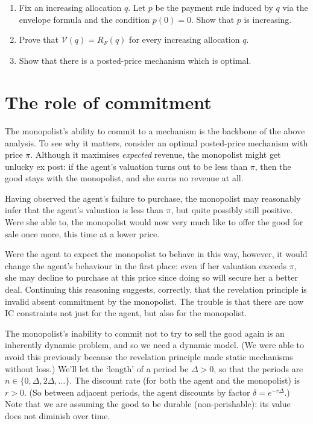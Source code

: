 \begin{exercise}
\begin{enumerate}[label=(\alph*)]
\begin{enumerate}[label=(\roman*)]
			\item Fix an increasing allocation $q$.
			Let $p$ be the payment rule induced by $q$ via the envelope formula and the condition $p(0)=0$.
			Show that $p$ is increasing.

			\item 
			Prove that
			$\mathcal{V}(q) = R_{\underline{F}}(q)$
			for every increasing allocation $q$.

			\item
			Show that there is a posted-price mechanism which is optimal.
		
		\end{enumerate}
	
	\end{enumerate}
\end{exercise}



\section{The role of commitment}
\label{sec:ch1:commitment}

The monopolist's ability to commit to a mechanism is the backbone of the above analysis. To see why it matters, consider an optimal posted-price mechanism with price $\pi$. Although it maximises \emph{expected} revenue, the monopolist might get unlucky ex post: if the agent's valuation turns out to be less than $\pi$, then the good stays with the monopolist, and she earns no revenue at all.

Having observed the agent's failure to purchase, the monopolist may reasonably infer that the agent's valuation is less than $\pi$, but quite possibly still positive.
Were she able to, the monopolist would now very much like to offer the good for sale once more, this time at a lower price.

Were the agent to expect the monopolist to behave in this way, however,
it would change the agent's behaviour in the first place: even if her valuation exceeds $\pi$, she may decline to purchase at this price since doing so will secure her a better deal.
Continuing this reasoning suggests, correctly, that the revelation principle is invalid absent commitment by the monopolist.
The trouble is that there are now IC constraints not just for the agent, but also for the monopolist.

The monopolist's inability to commit not to try to sell the good again is an inherently dynamic problem,
and so we need a dynamic model.
(We were able to avoid this previously because the revelation principle made static mechanisms without loss.)
We'll let the `length' of a period be $\Delta>0$,
so that the periods are $n \in \{0,\Delta,2\Delta,\dots\}$.
The discount rate (for both the agent and the monopolist) is $r>0$.
(So between adjacent periods, the agent discounts by factor $\delta = e^{-r\Delta}$.)
Note that we are assuming the good to be durable (non-perishable): its value does not diminish over time.

